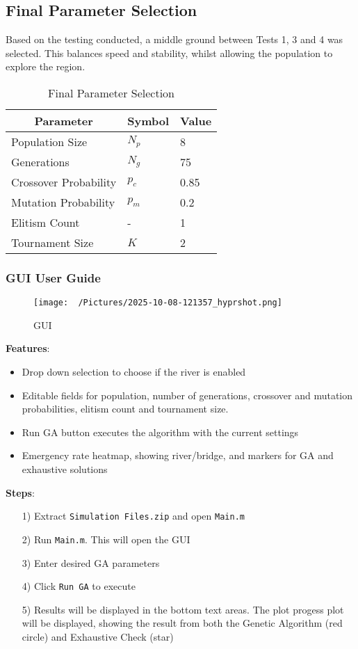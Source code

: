\documentclass[12pt,a4paper]{article}
\begin{document}
\subsection{Final Parameter Selection}
Based on the testing conducted, a middle ground between Tests 1, 3 and 4 was selected. This balances speed and stability, whilst allowing the population to explore the region.
\begin{table}[H]
	\centering
	\caption{Final Parameter Selection}
	\label{tab:Final Parameter Selection}
	\begin{tabular}{|l|l|l|}
\hline
\multicolumn{1}{|c|}{\textbf{Parameter}} & \multicolumn{1}{c|}{\textbf{Symbol}} & \multicolumn{1}{c|}{\textbf{Value}} \\ \hline
Population Size & $N_p$ & 8 \\ \hline
Generations & $N_g$ & 75 \\ \hline
Crossover Probability & $p_c$ & 0.85 \\ \hline
Mutation Probability & $p_m$ & 0.2 \\ \hline
Elitism Count & - & 1 \\ \hline
Tournament Size & $K$ & 2 \\ \hline
\end{tabular}\end{table}


\subsubsection{GUI User Guide}
\begin{figure}[H]
	\centering
	\texttt{[image: ~/Pictures/2025-10-08-121357\_hyprshot.png]}
	\caption{GUI}
	\label{fig:GUI}
\end{figure}
\textbf{Features}:
\begin{itemize} 
	\item Drop down selection to choose if the river is enabled
	\item Editable fields for population, number of generations, crossover and mutation probabilities, elitism count and tournament size. 
	\item Run GA button executes the algorithm with the current settings
	\item Emergency rate heatmap, showing river/bridge, and markers for GA and exhaustive solutions 
\end{itemize}
\textbf{Steps}:
\begin{enumerate}
	\item [1)] Extract \texttt{Simulation Files.zip} and open \texttt{Main.m}
		\hfill
	\item [2)] Run \texttt{Main.m}. This will open the GUI
		\hfill
	\item [3)] Enter desired GA parameters
		\hfill
	\item [4)] Click \texttt{Run GA} to execute
		\hfill
	\item [5)] Results will be displayed in the bottom text areas. The plot progess plot will be displayed, showing the result from both the Genetic Algorithm (red circle) and Exhaustive Check (star)
		\hfill
\end{enumerate}
\end{document}
